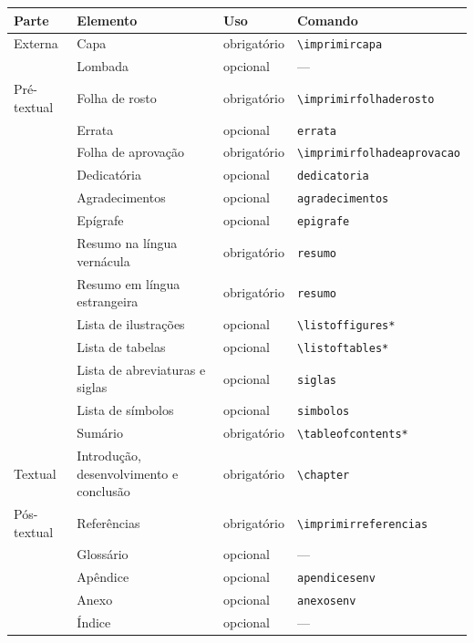 \documentclass[
	12pt, %
	openright, %
	oneside, %
	a4paper, %
	sumario=tradicional, %
	english, %
	brazil, %
]{abntex2}
\begin{document}
\begin{quadro}[htbp]
	\caption{Elementos do trabalho acadêmico}\label{qua:estrutura}
	\centering
	\footnotesize
	\begin{tabular}{p{}p{}p{}p{}}
		\toprule
		\textbf{Parte} & \textbf{Elemento} & \textbf{Uso} & \textbf{Comando} \\
		\midrule
		Externa & Capa & obrigatório & \verb|\imprimircapa| \\
		& Lombada & opcional & --- \\
		\midrule
		Pré-textual & Folha de rosto & obrigatório & \verb|\imprimirfolhaderosto| \\
		& Errata & opcional & \texttt{errata} \\
		& Folha de aprovação & obrigatório & \verb|\imprimirfolhadeaprovacao| \\
		& Dedicatória & opcional & \texttt{dedicatoria} \\
		& Agradecimentos & opcional & \texttt{agradecimentos} \\
		& Epígrafe & opcional & \texttt{epigrafe} \\
		& Resumo na língua vernácula & obrigatório & \texttt{resumo} \\
		& Resumo em língua estrangeira & obrigatório & \texttt{resumo} \\
		& Lista de ilustrações & opcional & \verb|\listoffigures*| \\
		& Lista de tabelas & opcional & \verb|\listoftables*| \\
		& Lista de abreviaturas e siglas & opcional & \texttt{siglas} \\
		& Lista de símbolos & opcional & \texttt{simbolos} \\
		& Sumário & obrigatório & \verb|\tableofcontents*| \\
		\midrule
		Textual & Introdução, desenvolvimento e conclusão & obrigatório & \verb|\chapter| \\
		\midrule
		Pós-textual & Referências & obrigatório & \verb|\imprimirreferencias| \\
		& Glossário & opcional & --- \\
		& Apêndice & opcional & \texttt{apendicesenv} \\
		& Anexo & opcional & \texttt{anexosenv} \\
		& Índice & opcional & --- \\
		\bottomrule
	\end{tabular}
\end{quadro}
\end{document}
